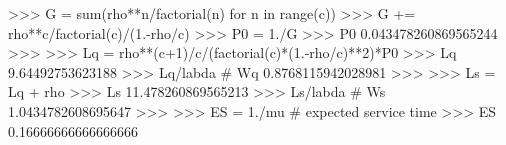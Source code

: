 
>>> G = sum(rho**n/factorial(n) for n in range(c))
>>> G += rho**c/factorial(c)/(1.-rho/c)
>>> P0 = 1./G
>>> P0
0.043478260869565244
>>>
>>> Lq = rho**(c+1)/c/(factorial(c)*(1.-rho/c)**2)*P0
>>> Lq
9.64492753623188
>>> Lq/labda # Wq
0.8768115942028981
>>>
>>> Ls = Lq + rho
>>> Ls
11.478260869565213
>>> Ls/labda # Ws
1.0434782608695647
>>>
>>> ES = 1./mu # expected service time
>>> ES
0.16666666666666666


